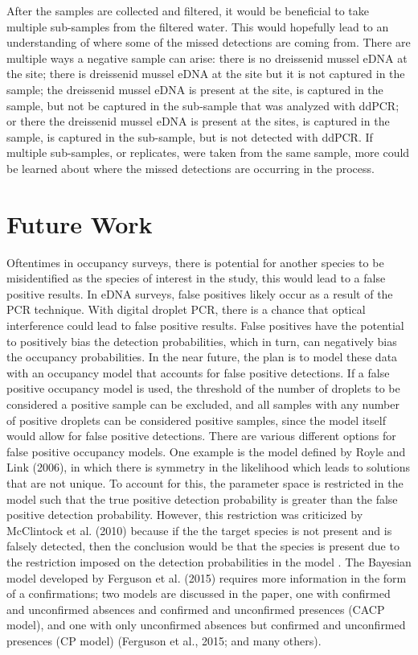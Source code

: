 \documentclass[12pt]{article}\usepackage[]{graphicx}\usepackage[]{color}
\begin{document}
After the samples are collected and filtered, it would be beneficial to take multiple sub-samples from the filtered water. This would hopefully lead to an understanding of where some of the missed detections are coming from. There are multiple ways a negative sample can arise: there is no dreissenid mussel eDNA at the site; there is dreissenid mussel eDNA at the site but it is not captured in the sample; the dreissenid mussel eDNA is present at the site, is captured in the sample, but not be captured in the sub-sample that was analyzed with ddPCR; or there the dreissenid mussel eDNA is present at the sites, is captured in the sample, is captured in the sub-sample, but is not detected with ddPCR. If multiple sub-samples, or replicates, were taken from the same sample, more could be learned about where the missed detections are occurring in the process.

\section{Future Work}

Oftentimes in occupancy surveys, there is potential for another species to be misidentified as the species of interest in the study, this would lead to a false positive results. In eDNA surveys, false positives likely occur as a result of the PCR technique. With digital droplet PCR, there is a chance that optical interference could lead to false positive results. False positives have the potential to positively bias the detection probabilities, which in turn, can negatively bias the occupancy probabilities. In the near future, the plan is to model these data with an occupancy model that accounts for false positive detections. If a false positive occupancy model is used, the threshold of the number of droplets to be considered a positive sample can be excluded, and all samples with any number of positive droplets can be considered positive samples, since the model itself would allow for false positive detections. There are various different options for false positive occupancy models. One example is the model defined by Royle and Link (2006), in which there is symmetry in the likelihood which leads to solutions that are not unique. To account for this, the parameter space is restricted in the model such that the true positive detection probability is greater than the false positive detection probability. However, this restriction was criticized by McClintock et al. (2010) because if the the target species is not present and is falsely detected, then the conclusion would be that the species is present due to the restriction imposed on the detection probabilities in the model \cite{McClintock}. The Bayesian model developed by Ferguson et al. (2015) requires more information in the form of a confirmations; two models are discussed in the paper, one with confirmed and unconfirmed absences and confirmed and unconfirmed presences (CACP model), and one with only unconfirmed absences but confirmed and unconfirmed presences (CP model) (Ferguson et al., 2015; and many others).
\end{document}
